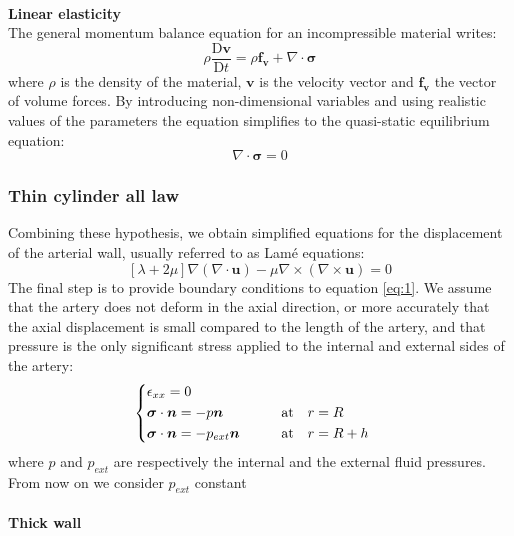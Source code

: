\documentclass[12pt,a4paper]{article}
\numberwithin{equation}{section}
\begin{document}
\\
{\bf Linear elasticity}\\
The general momentum balance equation for an incompressible material writes:
\begin{equation*}
\rho \frac{\textrm{D}\boldsymbol{v}}{\textrm{D}t} = \rho \boldsymbol{f_v}+\nabla\cdot\boldsymbol{\sigma}
\end{equation*}
where $\rho$ is the density of the material, $\boldsymbol{v}$ is the velocity vector and $\boldsymbol{f_v}$ the vector of volume forces. By introducing non-dimensional variables and using realistic values of the parameters the equation simplifies to the quasi-static equilibrium equation:
\begin{equation*}
\nabla\cdot\boldsymbol{\sigma} = 0
\end{equation*}
\subsubsection{Thin cylinder all law}
Combining these hypothesis, we obtain simplified equations for the displacement of the arterial wall, usually referred to as Lamé equations:
\begin{equation} \label{eq:1}
[\lambda + 2\mu]\nabla(\nabla\cdot\boldsymbol{u})-\mu\nabla\times(\nabla\times\boldsymbol{u}) = 0
\end{equation}
The final step is to provide boundary conditions to equation \ref{eq:1}. We assume that the artery does not deform in the axial direction, or more accurately that the axial displacement is small compared to the length of the artery, and that pressure is the only significant stress applied to the internal and external sides of the artery:
\begin{equation} \label{boundary:2}
  \left\{
      \begin{aligned}
       & \epsilon_{xx} = 0 \\
       & \boldsymbol{\sigma} \cdot \boldsymbol{n} = -p\boldsymbol{n} &\qquad \text{at\quad} r &=R\\
       & \boldsymbol{\sigma} \cdot \boldsymbol{n} = -p_{ext}\boldsymbol{n} &\qquad \text{at\quad} r &=R+h
      \end{aligned}
    \right.
\end{equation}
where $p$ and $p_{ext}$ are respectively the internal and the external fluid pressures. From now on we consider $p_{ext}$ constant\\
\\
{\bf Thick wall}\\
\end{document}
